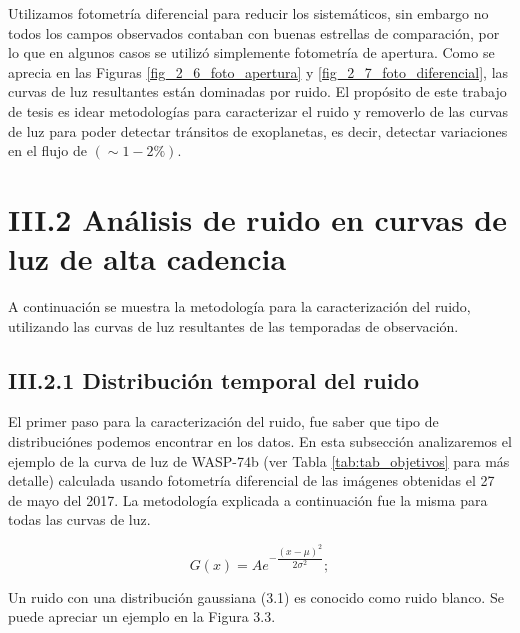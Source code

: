 Utilizamos fotometría diferencial para reducir los sistemáticos, sin embargo no todos los campos observados contaban con buenas estrellas de comparación, por lo que en algunos casos se utilizó simplemente fotometría de apertura. Como se aprecia en las Figuras \ref{fig_2_6_foto_apertura} y \ref{fig_2_7_foto_diferencial}, las curvas de luz resultantes están dominadas por ruido. El propósito de este trabajo de tesis es idear metodologías para caracterizar el ruido y removerlo de las curvas de luz para poder detectar tránsitos de exoplanetas, es decir, detectar variaciones en el flujo de $(\sim 1-2 \%)$.

\section*{III.2 Análisis de ruido en curvas de luz de alta cadencia}

A continuación se muestra la metodología para la caracterización del ruido, utilizando las curvas de luz resultantes de las temporadas de observación.

\subsection*{III.2.1 Distribución temporal del ruido}

El primer paso para la caracterización del ruido, fue saber que tipo de distribuciónes podemos encontrar en los datos. En esta subsección analizaremos el ejemplo de la curva de luz de WASP-74b (ver Tabla \ref{tab:tab_objetivos} para más detalle) calculada usando fotometría diferencial de las imágenes obtenidas el 27 de mayo del 2017. La metodología explicada a continuación fue la misma para todas las curvas de luz.

\begin{equation}
  G(x)=Ae^{-\dfrac{(x-\mu)^{2}}{2\sigma^{2}}};
\end{equation}

Un ruido con una distribución gaussiana (3.1) es conocido como ruido blanco. Se puede apreciar un ejemplo en la Figura 3.3.

